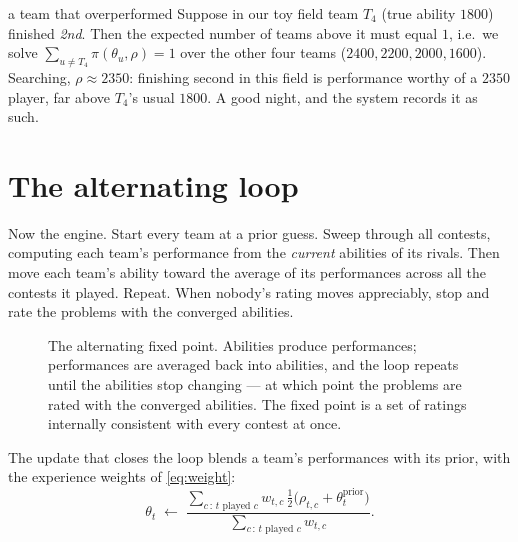 \documentclass[11pt]{report}
\theoremstyle{definition}
\numberwithin{equation}{chapter}
\begin{document}
\begin{worked}{a team that overperformed}
Suppose in our toy field team $T_4$ (true ability $1800$) finished \emph{2nd}.
Then the expected number of teams above it must equal $1$, i.e.\ we solve
$\sum_{u\neq T_4}\pi(\theta_u,\rho)=1$ over the other four teams
($2400,2200,2000,1600$). Searching, $\rho\approx 2350$: finishing second in this
field is performance worthy of a $2350$ player, far above $T_4$'s usual $1800$.
A good night, and the system records it as such.
\end{worked}

\section{The alternating loop}

Now the engine. Start every team at a prior guess. Sweep through all contests,
computing each team's performance from the \emph{current} abilities of its rivals.
Then move each team's ability toward the average of its performances across all
the contests it played. Repeat. When nobody's rating moves appreciably, stop and
rate the problems with the converged abilities.

\begin{figure}[h]
\centering
{}
\caption{The alternating fixed point. Abilities produce performances; performances
are averaged back into abilities, and the loop repeats until the abilities stop
changing --- at which point the problems are rated with the converged abilities.
The fixed point is a set of ratings internally consistent with every contest at once.}
\label{fig:loop}
\end{figure}

The update that closes the loop blends a team's performances with its prior, with
the experience weights of \eqref{eq:weight}:
\begin{equation}\label{eq:update}
  \theta_t \;\leftarrow\;
  \frac{\displaystyle\sum_{c\,:\,t\text{ played }c} w_{t,c}\,\tfrac12\big(\rho_{t,c}+\theta_t^{\text{prior}}\big)}
       {\displaystyle\sum_{c\,:\,t\text{ played }c} w_{t,c}} .
\end{equation}
\end{document}
